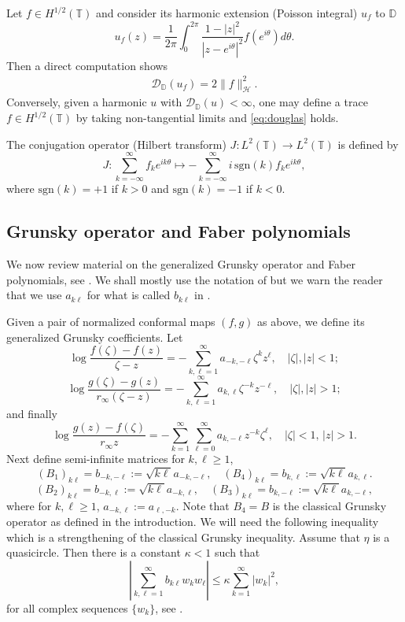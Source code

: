 \documentclass{article}
\numberwithin{equation}{section}
\numberwithin{figure}{section}
\theoremstyle{plain}
\theoremstyle{plain}
\numberwithin{thm}{section}
\theoremstyle{remark}
\newcommand{\T}{\mathbb{T}}
\newcommand{\D}{\mathbb{D}}
\let \le \leqslant
\let \ge \geqslant
\begin{document}
Let $f \in H^{1/2}(\T)$ and consider its harmonic extension (Poisson integral) $u_f$ to $\D$ 
\[
u_f(z) = \frac{1}{2\pi} \int_{0}^{2\pi}\frac{1-|z|^2}{|z-e^{i\theta}|^2}f(e^{i\theta}) d\theta.
\]
Then a direct computation shows
\begin{align}\label{eq:douglas}
    \mathcal{D}_{\D}(u_f) = 2 \|f\|_{\mathscr{H}}^2. 
\end{align}
Conversely, given a harmonic $u$ with $\mathcal{D}_{\D}(u) < \infty$, one may define a trace $f \in H^{1/2}(\T)$ by taking non-tangential limits and \eqref{eq:douglas} holds.


 The conjugation operator (Hilbert transform) $J:L^2(\T) \to L^2(\T)$ is defined by
 \[
 J:  \sum_{k=-\infty}^\infty f_k e^{ik\theta} \mapsto -  \sum_{k=-\infty}^\infty i\,  \textrm{sgn}(k) f_k e^{ik\theta},
 \]
 where $ \textrm{sgn}(k) = +1$ if $k > 0$ and  $ \textrm{sgn}(k) = -1$ if $k<0$. 
\subsection{Grunsky operator and Faber polynomials}We now review material on the generalized Grunsky operator and Faber polynomials, see \cite{Schiffer81, TT}. We shall mostly use the notation of \cite{TT} but we warn the reader that we use $a_{k\ell}$ for what is called $b_{k\ell}$ in \cite{TT}. 

Given a pair of normalized conformal maps $(f,g)$ as above, we define its generalized Grunsky coefficients. Let
\begin{equation}\label{defGrunskyB1}
\log\frac{f(\zeta)-f(z)}{\zeta-z}=-\sum_{k,\ell=1}^\infty a_{-k,-\ell}\zeta^{k}z^{\ell}, \quad |\zeta|,|z| < 1;
\end{equation}
\begin{equation}\label{defGrunskyB4}
\log\frac{g(\zeta)-g(z)}{r_\infty(\zeta-z)}=-\sum_{k,\ell=1}^\infty a_{k,\ell}\zeta^{-k}z^{-\ell}, \quad |\zeta|,|z| > 1;
\end{equation}
and finally
\begin{equation}\label{defGrunskyB3}
\log\frac{g(z)-f(\zeta)}{r_\infty z}=-\sum_{k=1}^\infty\sum_{\ell=0}^\infty a_{k,-\ell}z^{-k}\zeta^\ell, \quad |\zeta| < 1,\, |z| > 1.
\end{equation}
Next define semi-infinite matrices for $k, \ell \ge 1$,
\[
(B_1)_{k\ell} =b_{-k, -\ell}:= \sqrt{k\ell} a_{-k, -\ell}, \quad (B_4)_{k\ell} =b_{k, \ell}:= \sqrt{k\ell} a_{k,\ell}. 
\]
\[
(B_2)_{k\ell} = b_{-k, \ell} := \sqrt{k\ell}a_{-k,\ell}, \quad   (B_3)_{k\ell} = b_{k,- \ell} := \sqrt{k\ell}a_{k,-\ell}, 
\]
where for $k, \ell \ge 1$, $a_{-k,\ell} := a_{\ell,-k}$. Note that $B_4 = B$ is the classical Grunsky operator as defined in the introduction. 
We will need the following inequality which is a strengthening of the classical Grunsky inequality.
Assume that $\eta$ is a quasicircle. Then there is a constant $\kappa<1$ such that
\begin{equation}\label{Grunskyin}
\left|\sum_{k,\ell=1}^\infty b_{k\ell}w_kw_\ell\right|\le\kappa\sum_{k=1}^\infty |w_k|^2,
\end{equation}
for all complex sequences $\{w_k\}$, see \cite[Sec. 9.4]{Po}. 
\end{document}
